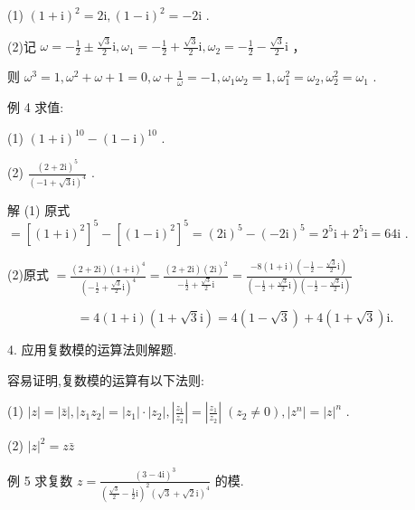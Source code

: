 \documentclass[10pt]{article}
\begin{document}
(1) \({\left( 1 + \mathrm{i}\right) }^{2} = 2\mathrm{i},{\left( 1 - \mathrm{i}\right) }^{2} =  - 2\mathrm{i}\) .

(2)记 \(\omega  =  - \frac{1}{2} \pm  \frac{\sqrt{3}}{2}\mathrm{i},{\omega }_{1} =  - \frac{1}{2} + \frac{\sqrt{3}}{2}\mathrm{i},{\omega }_{2} =  - \frac{1}{2} - \frac{\sqrt{3}}{2}\mathrm{i}\) ，

则 \({\omega }^{3} = 1,{\omega }^{2} + \omega  + 1 = 0,\omega  + \frac{1}{\omega } =  - 1,{\omega }_{1}{\omega }_{2} = 1,{\omega }_{1}^{2} = {\omega }_{2},{\omega }_{2}^{2} = {\omega }_{1}\) .

例 4 求值:

(1) \({\left( 1 + \mathrm{i}\right) }^{10} - {\left( 1 - \mathrm{i}\right) }^{10}\) .

(2) \(\frac{{\left( 2 + 2\mathrm{i}\right) }^{5}}{{\left( -1 + \sqrt{3}\mathrm{i}\right) }^{4}}\) .

解 (1) 原式 \(= {\left\lbrack  {\left( 1 + \mathrm{i}\right) }^{2}\right\rbrack  }^{5} - {\left\lbrack  {\left( 1 - \mathrm{i}\right) }^{2}\right\rbrack  }^{5} = {\left( 2\mathrm{i}\right) }^{5} - {\left( -2\mathrm{i}\right) }^{5} = {2}^{5}\mathrm{i} + {2}^{5}\mathrm{i} = {64}\mathrm{i}\) .

(2)原式 \(= \frac{\left( {2 + 2\mathrm{i}}\right) {\left( 1 + \mathrm{i}\right) }^{4}}{{\left( -\frac{1}{2} + \frac{\sqrt{3}}{2}\mathrm{i}\right) }^{4}} = \frac{\left( {2 + 2\mathrm{i}}\right) {\left( 2\mathrm{i}\right) }^{2}}{-\frac{1}{2} + \frac{\sqrt{3}}{2}\mathrm{i}} = \frac{-8\left( {1 + \mathrm{i}}\right) \left( {-\frac{1}{2} - \frac{\sqrt{3}}{2}\mathrm{i}}\right) }{\left( {-\frac{1}{2} + \frac{\sqrt{3}}{2}\mathrm{i}}\right) \left( {-\frac{1}{2} - \frac{\sqrt{3}}{2}\mathrm{i}}\right) }\)

\[
= 4\left( {1 + \mathrm{i}}\right) \left( {1 + \sqrt{3}\mathrm{i}}\right)  = 4\left( {1 - \sqrt{3}}\right)  + 4\left( {1 + \sqrt{3}}\right) \mathrm{i}.
\]

4. 应用复数模的运算法则解题.

容易证明,复数模的运算有以下法则:

(1) \(\left| z\right|  = \left| \bar{z}\right| ,\left| {{z}_{1}{z}_{2}}\right|  = \left| {z}_{1}\right|  \cdot  \left| {z}_{2}\right| ,\left| \frac{{z}_{1}}{{z}_{2}}\right|  = \left| \frac{{z}_{1}}{{z}_{2}}\right| \;\left( {{z}_{2} \neq  0}\right) ,\left| {z}^{n}\right|  = {\left| z\right| }^{n}\) .

(2) \({\left| z\right| }^{2} = z\bar{z}\)

例 5 求复数 \(z = \frac{{\left( 3 - 4\mathrm{i}\right) }^{3}}{{\left( \frac{\sqrt{3}}{2} - \frac{1}{2}\mathrm{i}\right) }^{2}{\left( \sqrt{3} + \sqrt{2}\mathrm{i}\right) }^{4}}\) 的模.
\end{document}
